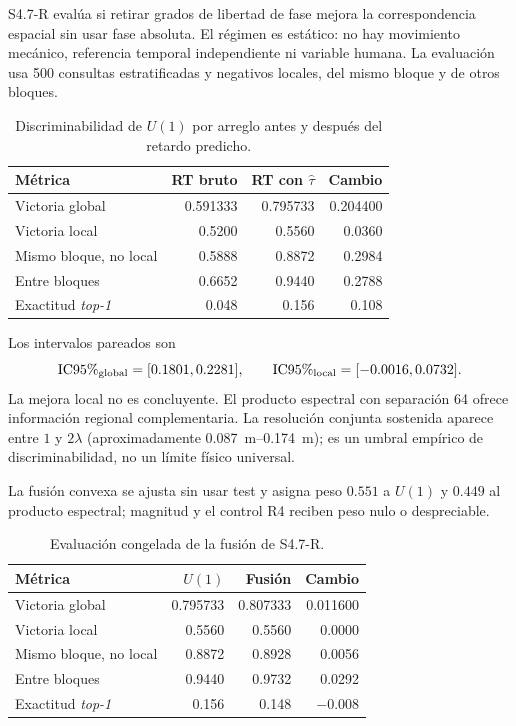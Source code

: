 S4.7-R evalúa si retirar grados de libertad de fase mejora la correspondencia espacial sin usar fase absoluta. El régimen es estático: no hay movimiento mecánico, referencia temporal independiente ni variable humana. La evaluación usa 500 consultas estratificadas y negativos locales, del mismo bloque y de otros bloques.

\begin{table}[htbp]
\centering\small
\caption{Discriminabilidad de $U(1)$ por arreglo antes y después del retardo predicho.}
\label{tab:s47_discriminability}
\begin{tabular}{lrrr}
\toprule
Métrica & RT bruto & RT con $\widehat\tau$ & Cambio\\
\midrule
Victoria global & 0.591333 & 0.795733 & 0.204400\\
Victoria local & 0.5200 & 0.5560 & 0.0360\\
Mismo bloque, no local & 0.5888 & 0.8872 & 0.2984\\
Entre bloques & 0.6652 & 0.9440 & 0.2788\\
Exactitud \emph{top-1} & 0.048 & 0.156 & 0.108\\
\bottomrule
\end{tabular}
\end{table}

Los intervalos pareados son
\[
\mathrm{IC95\%}_{\rm global}=[0.1801,0.2281],\qquad
\mathrm{IC95\%}_{\rm local}=[-0.0016,0.0732].
\]
La mejora local no es concluyente. El producto espectral con separación 64 ofrece información regional complementaria. La resolución conjunta sostenida aparece entre $1$ y $2\lambda$ (aproximadamente \SIrange{0.087}{0.174}{m}); es un umbral empírico de discriminabilidad, no un límite físico universal.

La fusión convexa se ajusta sin usar test y asigna peso $0.551$ a $U(1)$ y $0.449$ al producto espectral; magnitud y el control R4 reciben peso nulo o despreciable.

\begin{table}[htbp]
\centering\small
\caption{Evaluación congelada de la fusión de S4.7-R.}
\label{tab:s47_frozen_fusion}
\begin{tabular}{lrrr}
\toprule
Métrica & $U(1)$ & Fusión & Cambio\\
\midrule
Victoria global & 0.795733 & 0.807333 & 0.011600\\
Victoria local & 0.5560 & 0.5560 & 0.0000\\
Mismo bloque, no local & 0.8872 & 0.8928 & 0.0056\\
Entre bloques & 0.9440 & 0.9732 & 0.0292\\
Exactitud \emph{top-1} & 0.156 & 0.148 & $-0.008$\\
\bottomrule
\end{tabular}
\end{table}

